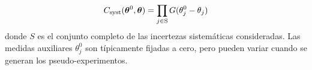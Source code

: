 \begin{equation}
  C_\text{syst} (\bm{\theta}^0, \bm{\theta}) = \prod_{j \in \text{S}} G(\theta_j^0 -
  \theta_j)
\end{equation}
%
donde $S$ es el conjunto completo de las incertezas sistemáticas consideradas. Las
medidas auxiliares $\theta^0_j$ son típicamente fijadas a cero, pero pueden
variar cuando se generan los pseudo-experimentos.








